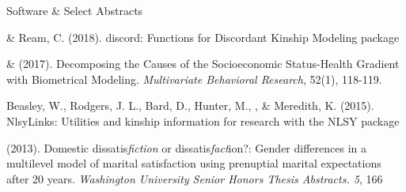 \begin{rSection}{\textrm{Software \& Select Abstracts}}%
\begin{etaremune}
\item\meb \& Ream, C. (2018). discord: Functions for Discordant Kinship Modeling \R package \href{https://CRAN.R-project.org/package=discord}{\color{blue}{https://CRAN.R-project.org/package=discord}}
\item\meb \& \joe (2017). Decomposing the Causes of the Socioeconomic Status-Health Gradient with Biometrical Modeling. \textit{Multivariate Behavioral Research}, 52(1), 118-119. \href{https://osf.io/xbkja/}{\color{blue}{https://osf.io/xbkja/}}
\item  Beasley, W., Rodgers, J. L., Bard, D., Hunter, M., \meb, \& Meredith, K. (2015). NlsyLinks: Utilities and kinship information for research with the NLSY \R package \href{https://cran.r-project.org/web/packages/NlsyLinks}{\color{blue}{https://cran.r-project.org/web/packages/NlsyLinks}}
\item\meb (2013). Domestic dissatis{\em fiction} or dissatis{\em fact}ion?: Gender differences in a multilevel model of marital satisfaction using prenuptial marital expectations after 20 years. {\em Washington University Senior Honors Thesis Abstracts. 5}, 166
\end{etaremune}
\end{rSection}